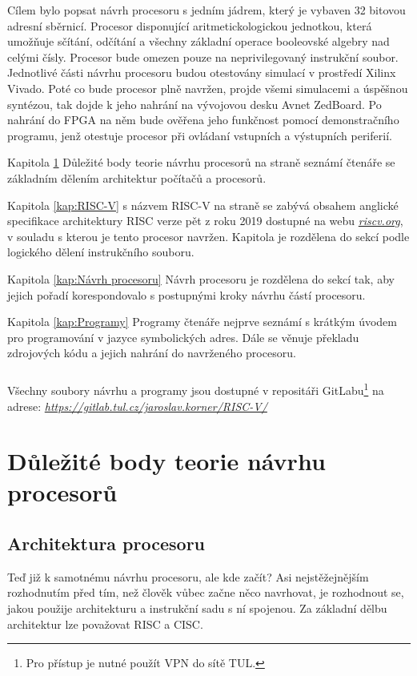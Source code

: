 \documentclass[FM,BP]{tulthesis}
\begin{document}
Cílem bylo popsat návrh procesoru s jedním jádrem, který je vybaven 32 bitovou adresní sběrnicí. Procesor disponující aritmetickologickou jednotkou, která umožňuje sčítání, odčítání a všechny základní operace booleovské algebry nad celými čísly. Procesor bude omezen pouze na neprivilegovaný instrukční soubor.
Jednotlivé části návrhu procesoru budou otestovány simulací v prostředí Xilinx Vivado. Poté co bude procesor plně navržen, projde všemi simulacemi a úspěšnou syntézou, tak dojde k jeho nahrání na vývojovou desku Avnet ZedBoard. Po nahrání do FPGA na něm bude ověřena jeho funkčnost pomocí demonstračního programu, jenž otestuje procesor při ovládaní vstupních a výstupních periferií. 

Kapitola \ref{kap:teorie_cpu} Důležité body teorie návrhu procesorů na straně \pageref{kap:teorie_cpu} seznámí čtenáře se základním dělením architektur počítačů a procesorů.

Kapitola \ref{kap:RISC-V} s názvem RISC-V na straně \pageref{kap:RISC-V} se zabývá obsahem anglické specifikace architektury RISC verze pět z roku 2019 dostupné na webu \href{https://riscv.org/wp-content/uploads/2019/12/riscv-spec-20191213.pdf}{\emph{riscv.org}}, v souladu s kterou je tento procesor navržen. Kapitola je rozdělena do sekcí podle logického dělení instrukčního souboru.

Kapitola \ref{kap:Návrh procesoru} Návrh procesoru je rozdělena do sekcí tak, aby jejich pořadí korespondovalo s postupnými kroky návrhu částí procesoru. 

Kapitola \ref{kap:Programy} Programy čtenáře nejprve seznámí s krátkým úvodem pro programování v jazyce symbolických adres. Dále se věnuje překladu zdrojových kódu a jejich nahrání do navrženého procesoru.

\paragraph{}
Všechny soubory návrhu a programy jsou dostupné v repositáři GitLabu\footnote{Pro přístup je nutné použít VPN do sítě TUL.} na adrese: 
\href{https://gitlab.tul.cz/jaroslav.korner/RISC-V/}{\emph{https://gitlab.tul.cz/jaroslav.korner/RISC-V/}} 

\chapter{Důležité body teorie návrhu procesorů} \label{kap:teorie_cpu}

\section{Architektura procesoru}
Teď již k samotnému návrhu procesoru, ale kde začít? Asi nejstěžejnějším rozhodnutím před tím, než člověk vůbec začne něco navrhovat, je rozhodnout se, jakou použije architekturu a instrukční sadu s ní spojenou. Za základní dělbu architektur lze považovat RISC a CISC. 
\end{document}
